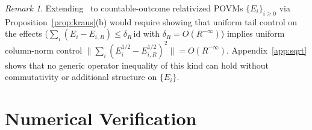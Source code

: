 \documentclass[11pt,a4paper]{article}
\theoremstyle{definition}
\theoremstyle{remark}
\newtheorem{remark}[theorem]{Remark}
\newcommand{\id}{\mathrm{id}}
\newcommand{\norm}[1]{\|#1\|}
\begin{document}
\begin{remark}\label{rem:kraus-appendix}
Extending~\cite[Cor.~4.7]{FewsterLoveridge2026} to countable-outcome relativized POVMs $\{E_i\}_{i\ge 0}$ via Proposition~\ref{prop:kraus}(b) would require showing that uniform tail control on the effects ($\sum_i (E_i - E_{i,R}) \le \delta_R\,\id$ with $\delta_R = O(R^{-\infty})$) implies uniform column-norm control $\norm{\sum_i (E_i^{1/2} - E_{i,R}^{1/2})^2} = O(R^{-\infty})$. Appendix~\ref{app:sqrt} shows that no generic operator inequality of this kind can hold without commutativity or additional structure on $\{E_i\}$.
\end{remark}

\section{Numerical Verification}
\label{sec:numerics}
\end{document}
